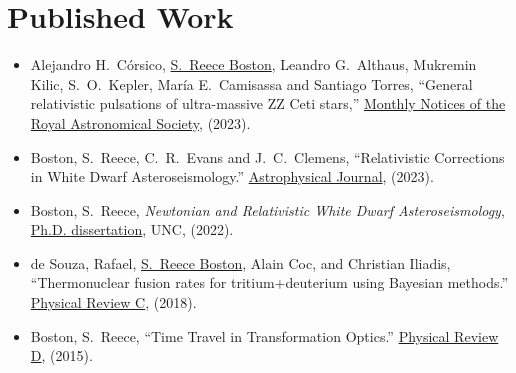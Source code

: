 \documentclass[11pt]{article}
\begin{document}
\section*{Published Work \href{https://orcid.org/0000-0001-8122-1961}{}}
%
\begin{itemize}
		\item Alejandro H.~C\'orsico, \underline{S.~Reece Boston}, Leandro G.~Althaus, Mukremin Kilic,
S.~O.~Kepler, Mar\'ia E.~Camisassa and Santiago Torres, ``General relativistic pulsations of ultra-massive ZZ Ceti stars,'' \href{https://doi.org/10.1093/mnras/stad2248}{Monthly Notices of the Royal Astronomical Society}, (2023).
		\item Boston, S.~Reece, C.~R.~Evans and J.~C.~Clemens, ``Relativistic Corrections in White Dwarf Asteroseismology.'' \href{https://iopscience.iop.org/article/10.3847/1538-4357/acd446}{Astrophysical Journal}, (2023).
		\item Boston, S.~Reece, \emph{Newtonian and Relativistic White Dwarf Asteroseismology}, \href{https://cdr.lib.unc.edu/concern/dissertations/jw827n44n?locale=en}{Ph.D. dissertation}, UNC, (2022).
		\item de Souza, Rafael, \underline{S.~Reece Boston}, Alain Coc, and Christian Iliadis, ``Thermonuclear fusion rates for tritium+deuterium using Bayesian methods.''  \href{http://journals.aps.org/prc/abstract/10.1103/PhysRevC.99.014619}{Physical Review C}, (2018).
		\item Boston, S.~Reece, ``Time Travel in Transformation Optics.''  \href{http://journals.aps.org/prd/abstract/10.1103/PhysRevD.91.124035}{Physical Review D}, (2015).
\end{itemize}
\end{document}
